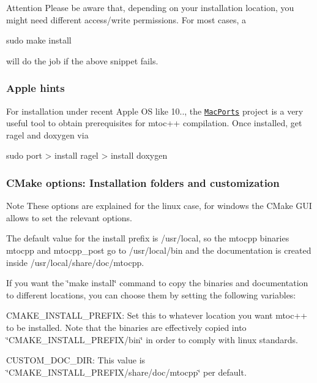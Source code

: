 \begin{DoxyAttention}{Attention}
Please be aware that, depending on your installation location, you might need different access/write permissions. For most cases, a
\begin{DoxyCode}
sudo make install
\end{DoxyCode}
 will do the job if the above snippet fails.
\end{DoxyAttention}
\hypertarget{install_inst_comp_apple}{}\subsubsection{Apple hints}\label{install_inst_comp_apple}
For installation under recent Apple O\+S like 10.., the \href{http://www.macports.org/}{\tt Mac\+Ports} project is a very useful tool to obtain prerequisites for mtoc++ compilation. Once installed, get {\ttfamily ragel} and {\ttfamily doxygen} via 
\begin{DoxyCode}
sudo port
> install ragel
> install doxygen
\end{DoxyCode}
\hypertarget{install_inst_cust}{}\subsubsection{C\+Make options\+: Installation folders and customization}\label{install_inst_cust}
\begin{DoxyNote}{Note}
These options are explained for the linux case, for windows the C\+Make G\+U\+I allows to set the relevant options.
\end{DoxyNote}
The default value for the install prefix is {\ttfamily /usr/local}, so the mtocpp binaries {\ttfamily mtocpp} and {\ttfamily mtocpp\+\_\+post} go to {\ttfamily /usr/local/bin} and the documentation is created inside {\ttfamily /usr/local/share/doc/mtocpp}.

If you want the \char`\"{}make install\char`\"{} command to copy the binaries and documentation to different locations, you can choose them by setting the following variables\+:
\begin{DoxyItemize}
\item C\+M\+A\+K\+E\+\_\+\+I\+N\+S\+T\+A\+L\+L\+\_\+\+P\+R\+E\+F\+I\+X\+: Set this to whatever location you want mtoc++ to be installed. Note that the binaries are effectively copied into \char`\"{}\+C\+M\+A\+K\+E\+\_\+\+I\+N\+S\+T\+A\+L\+L\+\_\+\+P\+R\+E\+F\+I\+X/bin\char`\"{} in order to comply with linux standards.
\item C\+U\+S\+T\+O\+M\+\_\+\+D\+O\+C\+\_\+\+D\+I\+R\+: This value is \char`\"{}\+C\+M\+A\+K\+E\+\_\+\+I\+N\+S\+T\+A\+L\+L\+\_\+\+P\+R\+E\+F\+I\+X/share/doc/mtocpp\char`\"{} per default.
\end{DoxyItemize}

